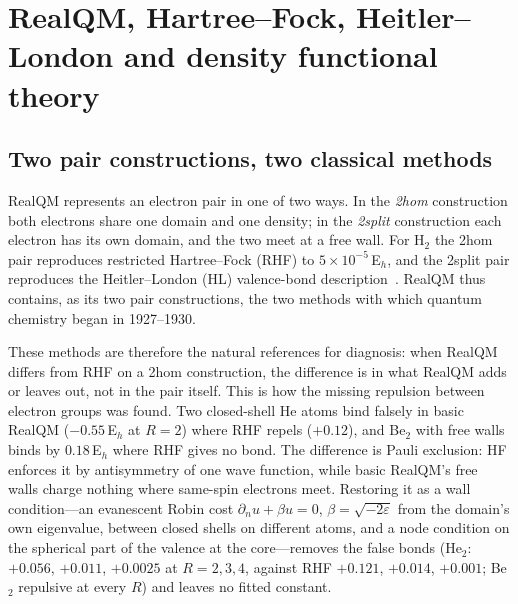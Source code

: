 \section{RealQM, Hartree--Fock, Heitler--London and density functional theory}
\label{sec:compare}

\subsection{Two pair constructions, two classical methods}

RealQM represents an electron pair in one of two ways. In the \emph{2hom} construction both electrons
share one domain and one density; in the \emph{2split} construction each electron has its own domain,
and the two meet at a free wall. For H$_2$ the 2hom pair reproduces restricted Hartree--Fock (RHF)
to $5\times10^{-5}$\,E$_h$, and the 2split pair reproduces the Heitler--London (HL) valence-bond
description~\cite{hl,hartree,fock}. RealQM thus contains, as its two pair constructions, the two methods
with which quantum chemistry began in 1927--1930.

These methods are therefore the natural references for diagnosis: when RealQM differs from RHF on a
2hom construction, the difference is in what RealQM adds or leaves out, not in the pair itself. This is
how the missing repulsion between electron groups was found. Two closed-shell He atoms bind falsely in
basic RealQM ($-0.55$\,E$_h$ at $R=2$) where RHF repels ($+0.12$), and Be$_2$ with free walls binds
by $0.18$\,E$_h$ where RHF gives no bond. The difference is Pauli exclusion: HF enforces it by
antisymmetry of one wave function, while basic RealQM's free walls charge nothing where same-spin
electrons meet. Restoring it as a wall condition---an evanescent Robin cost
$\partial_n u+\beta u=0$, $\beta=\sqrt{-2\varepsilon}$ from the domain's own eigenvalue, between closed
shells on different atoms, and a node condition on the spherical part of the valence at the core---removes
the false bonds (He$_2$: $+0.056$, $+0.011$, $+0.0025$ at $R=2,3,4$, against RHF $+0.121$, $+0.014$, $+0.001$; Be$_2$ repulsive at every $R$) and
leaves no fitted constant.

